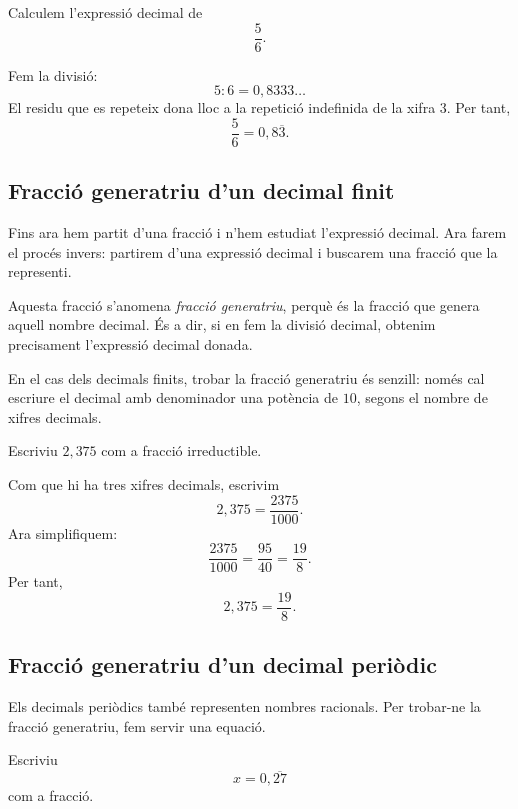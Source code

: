 \begin{exemple}
Calculem l'expressió decimal de
\[
	\frac{5}{6}.
\]
\end{exemple}

\begin{solucio}
Fem la divisió:
\[
	5:6=0{,}8333\ldots
\]
El residu que es repeteix dona lloc a la repetició indefinida de la xifra \(3\). Per tant,
\[
	\frac{5}{6}=0{,}8\overline{3}.
\]
\end{solucio}

\subsection{Fracció generatriu d'un decimal finit}

Fins ara hem partit d'una fracció i n'hem estudiat l'expressió decimal. Ara farem el procés invers: partirem d'una expressió decimal i buscarem una fracció que la representi.

Aquesta fracció s'anomena \emph{fracció generatriu}, perquè és la fracció que genera aquell nombre decimal. És a dir, si en fem la divisió decimal, obtenim precisament l'expressió decimal donada.

En el cas dels decimals finits, trobar la fracció generatriu és senzill: només cal escriure el decimal amb denominador una potència de \(10\), segons el nombre de xifres decimals.

\begin{exemple}
Escriviu \(2{,}375\) com a fracció irreductible.
\end{exemple}

\begin{solucio}
Com que hi ha tres xifres decimals, escrivim
\[
	2{,}375=\frac{2375}{1000}.
\]
Ara simplifiquem:
\[
	\frac{2375}{1000}
	=
	\frac{95}{40}
	=
	\frac{19}{8}.
\]
Per tant,
\[
	2{,}375=\frac{19}{8}.
\]
\end{solucio}

\subsection{Fracció generatriu d'un decimal periòdic}

Els decimals periòdics també representen nombres racionals. Per trobar-ne la fracció generatriu, fem servir una equació.

\begin{exemple}
Escriviu
\[
	x=0{,}\overline{27}
\]
com a fracció.
\end{exemple}

